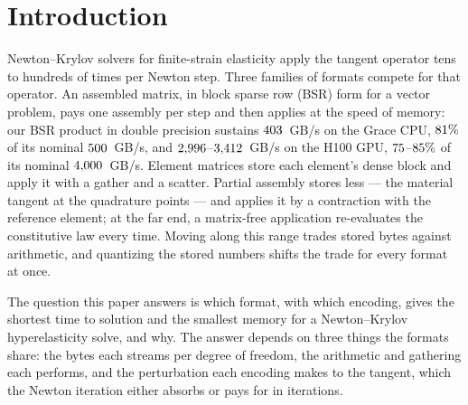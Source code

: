 \documentclass[sigconf,review]{acmart}
\begin{document}


\maketitle

\section{Introduction}

Newton--Krylov solvers for finite-strain elasticity apply the tangent operator tens to hundreds of
times per Newton step.  Three families of formats compete for that operator.  An assembled matrix,
in block sparse row (BSR) form for a vector problem, pays one assembly per step and then applies at
the speed of memory: our BSR product in double precision sustains $403$~GB/s on the
Grace CPU, $81\%$ of its nominal $500$~GB/s, and
$2{,}996$--$3{,}412$~GB/s on the H100 GPU,
$75$--$85\%$ of its nominal $4{,}000$~GB/s.  Element matrices store each element's dense block and apply it
with a gather and a scatter.  Partial assembly stores less --- the material tangent at the
quadrature points --- and applies it by a contraction with the reference element; at the far end, a matrix-free application re-evaluates the constitutive law every time.
Moving along this range trades stored bytes against arithmetic, and quantizing the stored numbers
shifts the trade for every format at once.

The question this paper answers is which format, with which encoding, gives the shortest time to
solution and the smallest memory for a Newton--Krylov hyperelasticity solve, and why.  The answer
depends on three things the formats share: the bytes each streams per degree of freedom, the
arithmetic and gathering each performs, and the perturbation each encoding makes to the tangent,
which the Newton iteration either absorbs or pays for in iterations.
\end{document}
